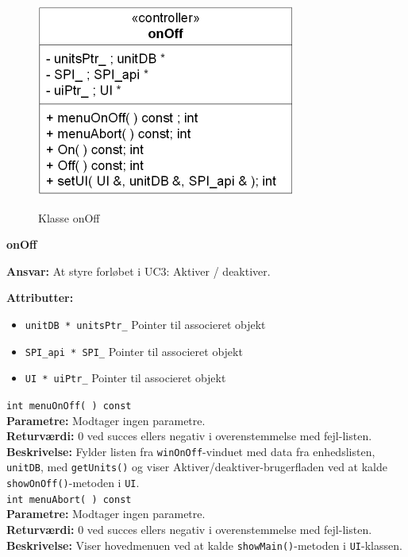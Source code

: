 \begin{figure}[htbp] \centering
{\includegraphics[scale=1.5]{filer/design/Klassediagrammer/sw_onOff}}
\caption{Klasse onOff}
\label{fig:onOff klassediagram}
\end{figure} 

{\centering
\textbf{onOff}\par
}
\textbf{Ansvar:} At styre forløbet i UC3: Aktiver / deaktiver. \

\textbf{Attributter:}
\begin{itemize}
	\item \verb+unitDB * unitsPtr_+ Pointer til associeret objekt
	\item \verb+SPI_api * SPI_+ Pointer til associeret objekt
	\item \verb+UI * uiPtr_+ Pointer til associeret objekt
\end{itemize}

\verb+int menuOnOff( ) const+ \\
\textbf{Parametre:} Modtager ingen parametre. \\
\textbf{Returværdi:} 0 ved succes ellers negativ i overenstemmelse med fejl-listen. \\
\textbf{Beskrivelse:} Fylder listen fra \verb+winOnOff+-vinduet med data fra enhedslisten, \verb+unitDB+, med \verb+getUnits()+ og viser Aktiver/deaktiver-brugerfladen ved at kalde \verb+showOnOff()+-metoden i \verb+UI+. \\

\verb+int menuAbort( ) const+ \\
\textbf{Parametre:} Modtager ingen parametre. \\
\textbf{Returværdi:} 0 ved succes ellers negativ i overenstemmelse med fejl-listen. \\
\textbf{Beskrivelse:} Viser hovedmenuen ved at kalde \verb+showMain()+-metoden i \verb+UI+-klassen.\\

